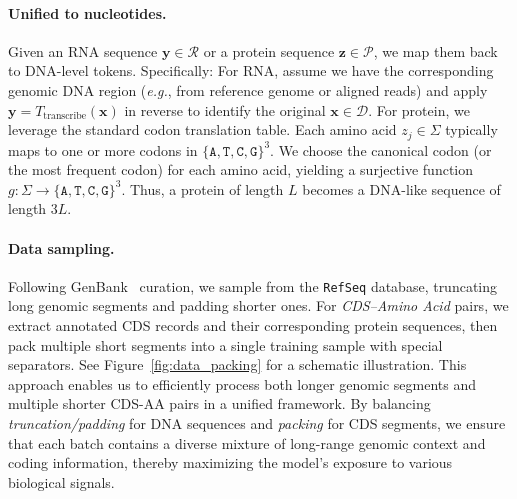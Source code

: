 \paragraph{Unified to nucleotides.} Given an RNA sequence \(\mathbf{y} \in \mathcal{R}\) or a protein sequence \(\mathbf{z} \in \mathcal{P}\), we map them back to DNA-level tokens. Specifically: For RNA, assume we have the corresponding genomic DNA region (\textit{e.g.}, from reference genome or aligned reads) and apply \(\mathbf{y} = T_{\mathrm{transcribe}}(\mathbf{x})\) in reverse to identify the original \(\mathbf{x} \in \mathcal{D}\). For protein, we leverage the standard codon translation table. Each amino acid \(z_j \in \Sigma\) typically maps to one or more codons in \(\{\texttt{A}, \texttt{T}, \texttt{C}, \texttt{G}\}^3\). We choose the canonical codon (or the most frequent codon) for each amino acid, yielding a surjective function
    \(g: \Sigma \to \{\texttt{A}, \texttt{T}, \texttt{C}, \texttt{G}\}^3.\)
Thus, a protein of length \(L\) becomes a DNA-like sequence of length \(3L\).

\paragraph{Data sampling.}
Following GenBank~\cite{benson2012genbank} curation, we sample from the \texttt{RefSeq} database, truncating long genomic segments and padding shorter ones. For \textit{CDS--Amino Acid} pairs, we extract annotated CDS records and their corresponding protein sequences, then pack multiple short segments into a single training sample with special separators. See Figure~\ref{fig:data_packing} for a schematic illustration.
This approach enables us to efficiently process both longer genomic segments and multiple shorter CDS-AA pairs in a unified framework. By balancing \emph{truncation/padding} for DNA sequences and \emph{packing} for CDS segments, we ensure that each batch contains a diverse mixture of long-range genomic context and coding information, thereby maximizing the model’s exposure to various biological signals.



